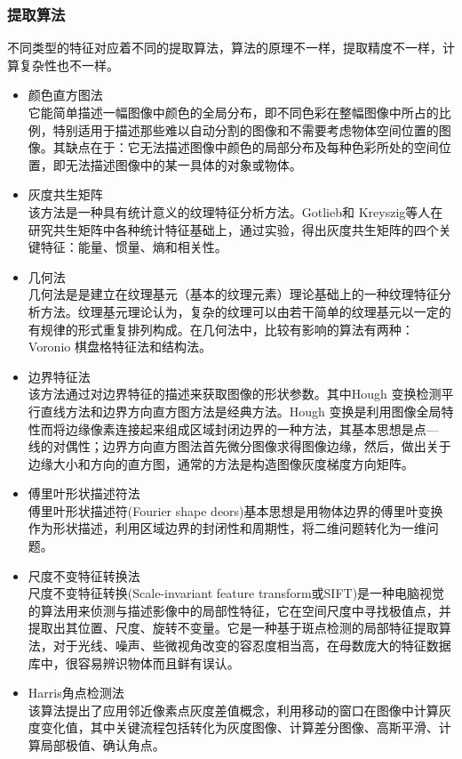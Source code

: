 \subsubsection{提取算法}
不同类型的特征对应着不同的提取算法，算法的原理不一样，提取精度不一样，计算复杂性也不一样。
\begin{itemize}
\item 颜色直方图法\\它能简单描述一幅图像中颜色的全局分布，即不同色彩在整幅图像中所占的比例，特别适用于描述那些难以自动分割的图像和不需要考虑物体空间位置的图像。其缺点在于：它无法描述图像中颜色的局部分布及每种色彩所处的空间位置，即无法描述图像中的某一具体的对象或物体。
\item 灰度共生矩阵\\ 该方法是一种具有统计意义的纹理特征分析方法。Gotlieb和 Kreyszig等人在研究共生矩阵中各种统计特征基础上，通过实验，得出灰度共生矩阵的四个关键特征：能量、惯量、熵和相关性。
\item 几何法\\几何法是是建立在纹理基元（基本的纹理元素）理论基础上的一种纹理特征分析方法。纹理基元理论认为，复杂的纹理可以由若干简单的纹理基元以一定的有规律的形式重复排列构成。在几何法中，比较有影响的算法有两种：Voronio 棋盘格特征法和结构法。
\item 边界特征法\\该方法通过对边界特征的描述来获取图像的形状参数。其中Hough 变换检测平行直线方法和边界方向直方图方法是经典方法。Hough 变换是利用图像全局特性而将边缘像素连接起来组成区域封闭边界的一种方法，其基本思想是点— 线的对偶性；边界方向直方图法首先微分图像求得图像边缘，然后，做出关于边缘大小和方向的直方图，通常的方法是构造图像灰度梯度方向矩阵。
\item 傅里叶形状描述符法\\傅里叶形状描述符(Fourier shape deors)基本思想是用物体边界的傅里叶变换作为形状描述，利用区域边界的封闭性和周期性，将二维问题转化为一维问题。
\item 尺度不变特征转换法\\尺度不变特征转换(Scale-invariant feature transform或SIFT)是一种电脑视觉的算法用来侦测与描述影像中的局部性特征，它在空间尺度中寻找极值点，并提取出其位置、尺度、旋转不变量。它是一种基于斑点检测的局部特征提取算法，对于光线、噪声、些微视角改变的容忍度相当高，在母数庞大的特征数据库中，很容易辨识物体而且鲜有误认。
\item Harris角点检测法\\该算法提出了应用邻近像素点灰度差值概念，利用移动的窗口在图像中计算灰度变化值，其中关键流程包括转化为灰度图像、计算差分图像、高斯平滑、计算局部极值、确认角点。
\end{itemize}

